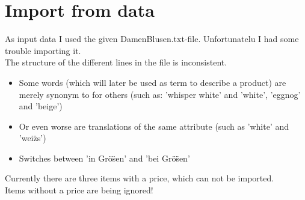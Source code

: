 

\section{Import from data}
As input data I used the given DamenBlusen.txt-file.
Unfortunatelu I had some trouble importing it.\\
The structure of the different lines in the file is inconsistent.
\begin{itemize}
    \item Some words (which will later be used as term to describe a product) are merely synonym to for others (such as: 'whisper white' and 'white', 'eggnog' and 'beige')
    \item Or even worse are translations of the same attribute (such as 'white' and 'wei\"zs')
    \item Switches between 'in Gr\"o\"sen' and 'bei Gr\"o\"sen'
\end{itemize}
Currently there are three items with a price, which can not be imported.\\
Items without a price are being ignored!


